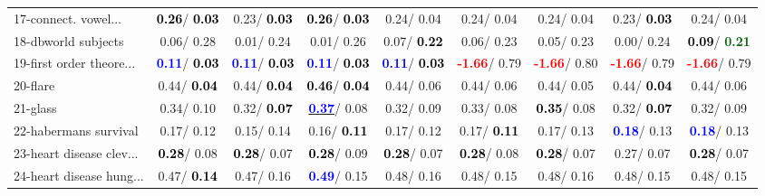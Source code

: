 \begin{table}[h]
\begin{center}
\begin{tabular}{lc|c|c|c|c|c|c|c}
17-connect. vowel... & \textcolor{black}{\textbf{  0.26}}/\textcolor{black}{\textbf{  0.03}} &   0.23/\textcolor{black}{\textbf{  0.03}} & \textcolor{black}{\textbf{  0.26}}/\textcolor{black}{\textbf{  0.03}} &   0.24/  0.04 &   0.24/  0.04 &   0.24/  0.04 &   0.23/\textcolor{black}{\textbf{  0.03}} &   0.24/  0.04 \\
18-dbworld subjects &   0.06/  0.28 &   0.01/  0.24 &   0.01/  0.26 &   0.07/\textcolor{black}{\textbf{  0.22}} &   0.06/  0.23 &   0.05/  0.23 &   0.00/  0.24 & \textcolor{black}{\textbf{  0.09}}/\textcolor{darkgreen}{\textbf{  0.21}} \\
19-first order theore... & \textcolor{blue}{\textbf{  0.11}}/\textcolor{black}{\textbf{  0.03}} & \textcolor{blue}{\textbf{  0.11}}/\textcolor{black}{\textbf{  0.03}} & \textcolor{blue}{\textbf{  0.11}}/\textcolor{black}{\textbf{  0.03}} & \textcolor{blue}{\textbf{  0.11}}/\textcolor{black}{\textbf{  0.03}} & \textcolor{red}{\textbf{ -1.66}}/  0.79 & \textcolor{red}{\textbf{ -1.66}}/  0.80 & \textcolor{red}{\textbf{ -1.66}}/  0.79 & \textcolor{red}{\textbf{ -1.66}}/  0.79 \\
20-flare &   0.44/\textcolor{black}{\textbf{  0.04}} &   0.44/\textcolor{black}{\textbf{  0.04}} & \textcolor{black}{\textbf{  0.46}}/\textcolor{black}{\textbf{  0.04}} &   0.44/  0.06 &   0.44/  0.06 &   0.44/  0.05 &   0.44/\textcolor{black}{\textbf{  0.04}} &   0.44/  0.06 \\
21-glass &   0.34/  0.10 &   0.32/\textcolor{black}{\textbf{  0.07}} & \underline{\textcolor{blue}{\textbf{  0.37}}}/  0.08 &   0.32/  0.09 &   0.33/  0.08 & \textcolor{black}{\textbf{  0.35}}/  0.08 &   0.32/\textcolor{black}{\textbf{  0.07}} &   0.32/  0.09 \\ \hline
22-habermans survival &   0.17/  0.12 &   0.15/  0.14 &   0.16/\textcolor{black}{\textbf{  0.11}} &   0.17/  0.12 &   0.17/\textcolor{black}{\textbf{  0.11}} &   0.17/  0.13 & \textcolor{blue}{\textbf{  0.18}}/  0.13 & \textcolor{blue}{\textbf{  0.18}}/  0.13 \\
23-heart disease clev... & \textcolor{black}{\textbf{  0.28}}/  0.08 & \textcolor{black}{\textbf{  0.28}}/  0.07 & \textcolor{black}{\textbf{  0.28}}/  0.09 & \textcolor{black}{\textbf{  0.28}}/  0.07 & \textcolor{black}{\textbf{  0.28}}/  0.08 & \textcolor{black}{\textbf{  0.28}}/  0.07 &   0.27/  0.07 & \textcolor{black}{\textbf{  0.28}}/  0.07 \\
24-heart disease hung... &   0.47/\textcolor{black}{\textbf{  0.14}} &   0.47/  0.16 & \textcolor{blue}{\textbf{  0.49}}/  0.15 &   0.48/  0.16 &   0.48/  0.15 &   0.48/  0.16 &   0.48/  0.15 &   0.48/  0.15 \\

\end{tabular}
\end{center}
\end{table}
